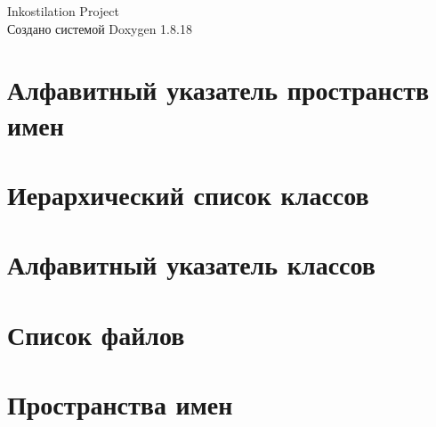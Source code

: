 \let\mypdfximage\pdfximage\def\pdfximage{\immediate\mypdfximage}\documentclass[twoside]{book}
\newcommand{\+}{\discretionary{\mbox{\scriptsize$\hookleftarrow$}}{}{}}
\newcommand{\clearemptydoublepage}{%
  \newpage{\pagestyle{empty}\cleardoublepage}%
}
\begin{document}
\hypersetup{pageanchor=false,
             bookmarksnumbered=true,
             pdfencoding=unicode
            }
\begin{titlepage}
\vspace*{7cm}
\begin{center}%
{\Large Inkostilation Project }\\
\vspace*{1cm}
{\large Создано системой Doxygen 1.8.18}\\
\end{center}
\end{titlepage}
\clearemptydoublepage
{}
\tableofcontents
\clearemptydoublepage
{}
\hypersetup{pageanchor=true}

\chapter{Алфавитный указатель пространств имен}

\chapter{Иерархический список классов}

\chapter{Алфавитный указатель классов}

\chapter{Список файлов}

\chapter{Пространства имен}


\end{document}

